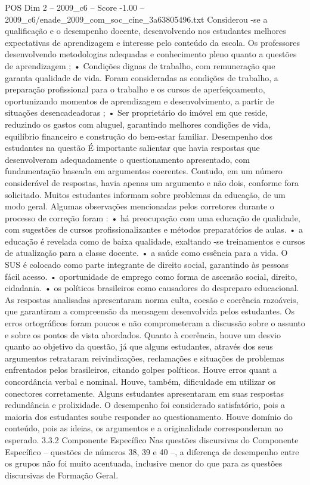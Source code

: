 \begin{textsample}{POS Dim 2 – 2009\_c6 – Score -1.00 – 2009\_c6/enade\_2009\_com\_soc\_cine\_3a63805496.txt}
Considerou -se a qualificação e o desempenho docente, desenvolvendo nos estudantes melhores expectativas de aprendizagem e interesse pelo conteúdo da escola.
Os professores desenvolvendo metodologias adequadas e conhecimento pleno quanto a questões de aprendizagem ; • Condições dignas de trabalho, com remuneração que garanta qualidade de vida.
Foram consideradas as condições de trabalho, a preparação profissional para o trabalho e os cursos de aperfeiçoamento, oportunizando momentos de aprendizagem e desenvolvimento, a partir de situações desencadeadoras ; • Ser proprietário do imóvel em que reside, reduzindo os gastos com aluguel, garantindo melhores condições de vida, equilíbrio financeiro e construção do bem-estar familiar.
Desempenho dos estudantes na questão É importante salientar que havia respostas que desenvolveram adequadamente o questionamento apresentado, com fundamentação baseada em argumentos coerentes.
Contudo, em um número considerável de respostas, havia apenas um argumento e não dois, conforme fora solicitado.
Muitos estudantes informam sobre problemas da educação, de um modo geral.
Algumas observações mencionadas pelos corretores durante o processo de correção foram : • há preocupação com uma educação de qualidade, com sugestões de cursos profissionalizantes e métodos preparatórios de aulas. • a educação é revelada como de baixa qualidade, exaltando -se treinamentos e cursos de atualização para a classe docente. • a saúde como essência para a vida.
O SUS é colocado como parte integrante de direito social, garantindo às pessoas fácil acesso. • oportunidade de emprego como forma de ascensão social, direito, cidadania. • os políticos brasileiros como causadores do despreparo educacional.
As respostas analisadas apresentaram norma culta, coesão e coerência razoáveis, que garantiram a compreensão da mensagem desenvolvida pelos estudantes.
Os erros ortográficos foram poucos e não comprometeram a discussão sobre o assunto e sobre os pontos de vista abordados.
Quanto à coerência, houve um desvio quanto ao objetivo da questão, já que alguns estudantes, através dos seus argumentos retrataram reivindicações, reclamações e situações de problemas enfrentados pelos brasileiros, citando golpes políticos.
Houve erros quant a concordância verbal e nominal.
Houve, também, dificuldade em utilizar os conectores corretamente.
Alguns estudantes apresentaram em suas respostas redundância e prolixidade.
O desempenho foi considerado satisfatório, pois a maioria dos estudantes soube responder ao questionamento.
Houve domínio do conteúdo, pois as ideias, os argumentos e a originalidade corresponderam ao esperado. 3.3.2 Componente Específico Nas questões discursivas do Componente Específico – questões de números 38, 39 e 40 –, a diferença de desempenho entre os grupos não foi muito acentuada, inclusive menor do que para as questões discursivas de Formação Geral.

\end{textsample}
